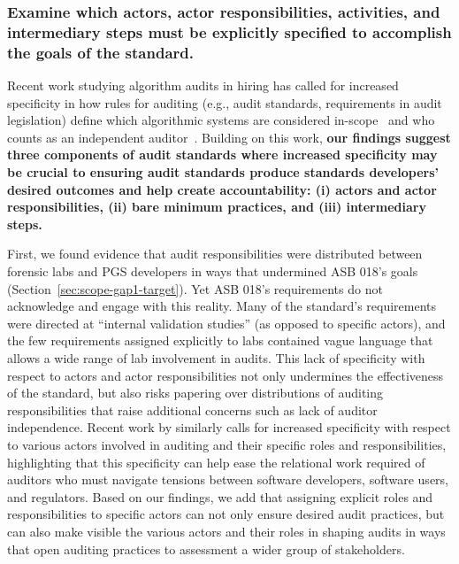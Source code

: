 \subsubsection{Examine which actors, actor responsibilities, activities, and intermediary steps must be explicitly specified to accomplish the goals of the standard.}
\label{sec:disc-design-specificity}
Recent work studying algorithm audits in hiring has called for increased specificity in how rules for auditing (e.g., audit standards, requirements in audit legislation) define which algorithmic systems are considered in-scope~\cite{wright2024null, groves2024auditing} and who counts as an independent auditor~\cite{groves2024auditing}. Building on this work, \textbf{our findings suggest three components of audit standards where increased specificity may be crucial to ensuring audit standards produce standards developers' desired outcomes and help create accountability: (i) actors and actor responsibilities, (ii) bare minimum practices, and (iii) intermediary steps.} 


First, we found evidence that audit responsibilities were distributed between forensic labs and PGS developers in ways that undermined ASB 018’s goals (Section~\ref{sec:scope-gap1-target}). Yet ASB 018’s requirements do not acknowledge and engage with this reality. Many of the standard's requirements were directed at ``internal validation studies'' (as opposed to specific actors), and the few requirements assigned explicitly to labs contained vague language that allows a wide range of lab involvement in audits. This lack of specificity with respect to actors and actor responsibilities not only undermines the effectiveness of the standard, but also risks papering over distributions of auditing responsibilities that raise additional concerns such as lack of auditor independence. Recent work by \citet{groves2024auditing} similarly calls for increased specificity with respect to various actors involved in auditing and their specific roles and responsibilities, highlighting that this specificity can help ease the relational work required of auditors who must navigate tensions between software developers, software users, and regulators. 
Based on our findings, we add that assigning explicit roles and responsibilities to specific actors can not only ensure desired audit practices, but can also make visible the various actors and their roles in shaping audits in ways that open auditing practices to assessment a wider group of stakeholders.



